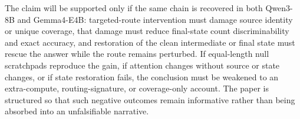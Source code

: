 \documentclass[11pt]{article}
\begin{document}
The claim will be supported only if the same chain is recovered in both Qwen3-8B and Gemma4-E4B: targeted-route intervention must damage source identity or unique coverage, that damage must reduce final-state count discriminability and exact accuracy, and restoration of the clean intermediate or final state must rescue the answer while the route remains perturbed. If equal-length null scratchpads reproduce the gain, if attention changes without source or state changes, or if state restoration fails, the conclusion must be weakened to an extra-compute, routing-signature, or coverage-only account. The paper is structured so that such negative outcomes remain informative rather than being absorbed into an unfalsifiable narrative.

\clearpage



\appendix

\end{document}
